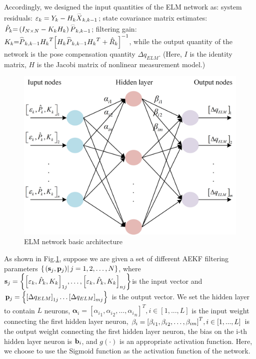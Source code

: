 \documentclass{article}
\begin{document}
	Accordingly, we designed the input quantities of the ELM network as: system residuals: ${\varepsilon _k} = {Y_k} - {H_k}{\mathord{\buildrel{\lower3pt\hbox{$\scriptscriptstyle\frown$}} \over X} _{k,k - 1}}$; state covariance matrix estimates: $ {\hat P_k}{\rm{ = }}\left( {{I_{N \times N}} - {K_k}{H_k}} \right){\mathord{\buildrel{\lower3pt\hbox{$\scriptscriptstyle\frown$}} 	\over P} _{k,k - 1}} $; filtering gain: $ {K_k}{\rm{ = }}{\mathord{\buildrel{\lower3pt\hbox{$\scriptscriptstyle\frown$}} 
			\over P} _{k,k - 1}}{H_k}^T{\left[ {{H_k}{{\mathord{\buildrel{\lower3pt\hbox{$\scriptscriptstyle\frown$}} 
						\over P} }_{k,k - 1}}{H_k}^T + {{\hat R}_k}} \right]^{ - 1}} $, 
	while the output quantity of the network is the pose compensation quantity $\Delta {q_{ELM}}$. (Here, $ I $ is the identity matrix, $ H $ is the Jacobi matrix of nonlinear measurement model.)
	
	\begin{figure}
		\centering
		\includegraphics[width=0.8\linewidth]{pic/ELMnetwork1.png}
		\caption{ELM network basic architecture}
		\label{fig:elmnetwork}
	\end{figure}
	
	As shown in Fig.\ref{fig:elmnetwork}, suppose we are given a set of different AEKF filtering parameters $ \left\{ {\left. {\left( {{{\bf{s}}_j},{{\bf{p}}_j}} \right)} \right|j = 1,2, \ldots ,N} \right\} $, where $ {{\bf{s}}_j} = \left\{ {{{\left[ {{\varepsilon _k},{{\hat P}_k},{K_k}} \right]}_{1j}}, \ldots ,{{\left[ {{\varepsilon _k},{{\hat P}_k},{K_k}} \right]}_{nj}}} \right\} $is the input vector and $ {{\bf{p}}_j} = \left\{ {{{\left[ {\Delta {q_{ELM}}} \right]}_{1j}} \ldots {{\left[ {\Delta {q_{ELM}}} \right]}_{mj}}} \right\} $ is the output vector. We set the hidden layer to contain $L$ neurons, $ {{\mathbf{\alpha }}_i} = {\left[ {{\alpha _i}_1,{\alpha _i}_2, \ldots ,{\alpha _i}_n} \right]^T},i \in \left[ {1,...,L} \right] $ is the input weight connecting the first hidden layer neuron, $ {{\bf{\beta }}_i} = {\left[ {{\beta _i}_1,{\beta _i}_2, \ldots ,{\beta _{im}}} \right]^T},i \in \left[ {1,...,L} \right] $ is the output weight connecting the first hidden layer neuron, the bias on the i-th hidden layer neuron is $ {{\bf{b}}_i} $, and $ g( \cdot ) $ is an appropriate activation function. Here, we choose to use the Sigmoid function as the activation function of the network.	
	
\end{document}
